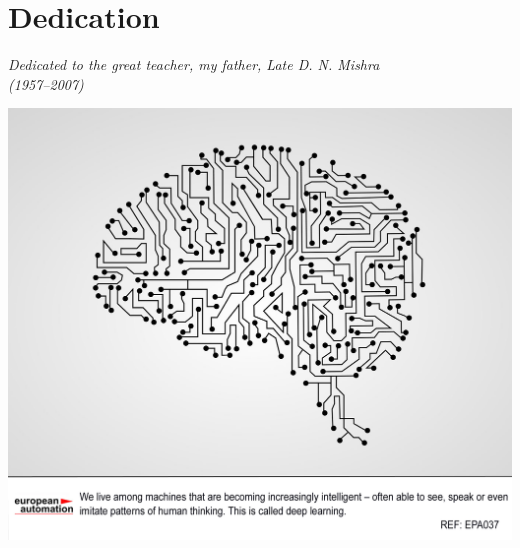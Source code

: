 \documentclass[a4paper,12pt]{report}%
\begin{document}



\newpage

\section*{\hfill \Huge \color{IAF} Dedication}

 \bigskip

{\flushright \color{IAF} \it \large Dedicated to the great teacher, my father, Late D. N. Mishra \\ \hfill (1957--2007)}

 \bigskip

\newpage
\includegraphics[width=1.0\textwidth]{./images/deep-learning-eu.jpg}
\end{document}
